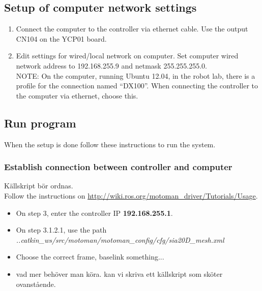\documentclass[10pt,a4paper]{article}
\begin{document}
\subsection{Setup of computer network settings}

\begin{enumerate}

\item Connect the computer to the controller via ethernet cable. Use the output CN104 on the YCP01 board.
\item Edit settings for wired/local network on computer. Set computer wired network address to 192.168.255.9 and netmask 255.255.255.0.\\


NOTE: On the computer, running Ubuntu 12.04, in the robot lab, there is a profile for the connection named “DX100”. When connecting the controller to the computer via ethernet, choose this.
\end{enumerate}

\subsection{Run program}
When the setup is done follow these instructions to run the system.
\subsubsection{Establish connection between controller and computer}
Källskript bör ordnas.\\
Follow the instructions on \url{http://wiki.ros.org/motoman\_driver/Tutorials/Usage}.
\begin{itemize}


\item On step 3, enter the controller IP \textbf{192.168.255.1}.

\item  On step 3.1.2.1, use the path \textit{..catkin\_ws/src/motoman/motoman\_config/cfg/sia20D\_mesh.xml}

\item Choose the correct frame, baselink something...

\item vad mer behöver man köra. kan vi skriva ett källskript som sköter ovanstående.
\end{itemize}
\end{document}
